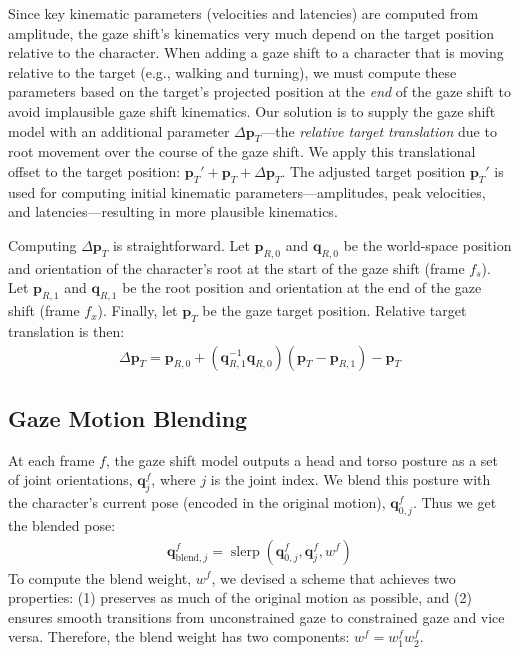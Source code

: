 Since key kinematic parameters (velocities and latencies) are computed from amplitude, the gaze shift's kinematics very much depend on the target position relative to the character. When adding a gaze shift to a character that is moving relative to the target (e.g., walking and turning), we must compute these parameters based on the target's projected position at the \emph{end} of the gaze shift to avoid implausible gaze shift kinematics. Our solution is to supply the gaze shift model with an additional parameter $\Delta \mathbf{p}_T$---the \emph{relative target translation} due to root movement over the course of the gaze shift. We apply this translational offset to the target position: $\mathbf{p}_T' + \mathbf{p}_T + \Delta \mathbf{p}_T$. The adjusted target position $\mathbf{p}_T'$ is used for computing initial kinematic parameters---amplitudes, peak velocities, and latencies---resulting in more plausible kinematics.

Computing $\Delta \mathbf{p}_T$ is straightforward. Let $\mathbf{p}_{R,0}$ and $\mathbf{q}_{R,0}$ be the world-space position and orientation of the character's root at the start of the gaze shift (frame $f_s$). Let $\mathbf{p}_{R,1}$ and $\mathbf{q}_{R,1}$ be the root position and orientation at the end of the gaze shift (frame $f_x$). Finally, let $\mathbf{p}_T$ be the gaze target position. Relative target translation is then:
%
\begin{align} \label{eq:GazeShiftTargetTrans}
\Delta \mathbf{p}_T = \mathbf{p}_{R,0} + (\mathbf{q}_{R,1}^{-1} \mathbf{q}_{R,0}) (\mathbf{p}_T - \mathbf{p}_{R,1}) - \mathbf{p}_T
\end{align}
%
\subsection{Gaze Motion Blending}
\label{sec:GazeMotionBlending}

At each frame $f$, the gaze shift model outputs a head and torso posture as a set of joint orientations, $\mathbf{q}_j^f$, where $j$ is the joint index. We blend this posture with the character's current pose (encoded in the original motion), $\mathbf{q}_{0,j}^f$. Thus we get the blended pose:
%
\begin{align} \label{eq:GazeShiftPoseBlend}
\mathbf{q}_{\mathrm{blend},j}^f = \mathop{slerp}(\mathbf{q}_{0,j}^f, \mathbf{q}_j^f, w^f)
\end{align}
%
To compute the blend weight, $w^f$, we devised a scheme that achieves two properties: (1) preserves as much of the original motion as possible, and (2) ensures smooth transitions from unconstrained gaze to constrained gaze and vice versa. Therefore, the blend weight has two components: $w^f = w_1^f w_2^f$.

